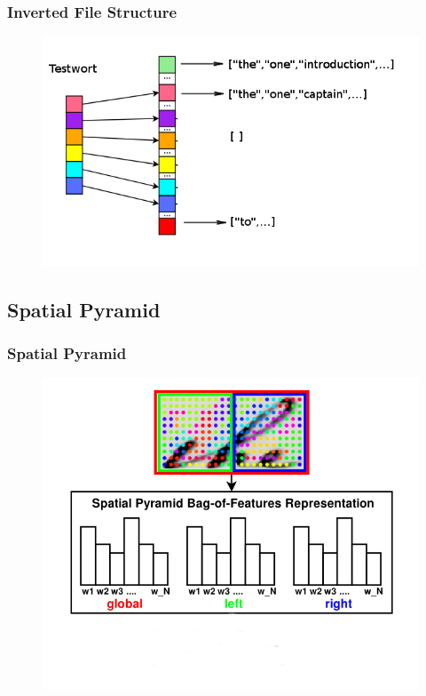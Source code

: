 \documentclass[9pt]{beamer}
\begin{document}
			\begin{frame}
				\frametitle{Inverted File Structure}
				\begin{figure}
					\centering
					\includegraphics[scale=0.5]{Images/IFS.png}
				\end{figure}
			\end{frame}
			
		\subsection{Spatial Pyramid}
		
			\begin{frame}
				\frametitle{Spatial Pyramid}
				\begin{figure}
					\centering
					\includegraphics[scale=0.3]{Images/SpatialPyramids.png}
				\end{figure}
			\end{frame}
			
\end{document}
